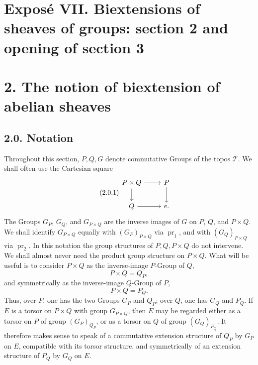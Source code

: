 \documentclass[11pt]{article}
\providecommand{\pr}{\operatorname{pr}}
\providecommand{\id}{\operatorname{id}}
\begin{document}
\providecommand{\BIEXT}{\operatorname{BIEXT}}
\providecommand{\Biext}{\operatorname{Biext}}
\providecommand{\GRAB}{\operatorname{GRAB}}
\providecommand{\TORSBIRIG}{\operatorname{TORSBIRIG}}
\providecommand{\Corr}{\operatorname{Corr}}
\providecommand{\sym}{\mathrm{sym}}
\providecommand{\id}{\mathrm{id}}
\providecommand{\cY}{\mathcal Y}
\providecommand{\cC}{\mathcal C}
\providecommand{\e}{\mathrm e}

\section*{Exposé VII. Biextensions of sheaves of groups: section 2 and opening of section 3}

\section*{2. The notion of biextension of abelian sheaves}

\subsection*{2.0. Notation}
Throughout this section, \(P,Q,G\) denote commutative Groups of the topos \(\mathcal T\).  We shall often use the Cartesian square
\begin{equation}\tag{2.0.1}
\begin{tikzcd}
P\times Q \arrow[r] \arrow[d] & P\arrow[d]\\
Q\arrow[r] & e .
\end{tikzcd}
\end{equation}
The Groups \(G_P\), \(G_Q\), and \(G_{P\times Q}\) are the inverse images of \(G\) on \(P\), \(Q\), and \(P\times Q\).  We shall identify \(G_{P\times Q}\) equally with \((G_P)_{P\times Q}\) via \(\pr_1\), and with \((G_Q)_{P\times Q}\) via \(\pr_2\).  In this notation the group structures of \(P,Q,P\times Q\) do not intervene.  We shall almost never need the product group structure on \(P\times Q\).  What will be useful is to consider \(P\times Q\) as the inverse-image \(P\)-Group of \(Q\),
\begin{equation}\tag{2.0.2}
  P\times Q=Q_P,
\end{equation}
and symmetrically as the inverse-image \(Q\)-Group of \(P\),
\begin{equation}\tag{2.0.3}
  P\times Q=P_Q.
\end{equation}
Thus, over \(P\), one has the two Groups \(G_P\) and \(Q_P\); over \(Q\), one has \(G_Q\) and \(P_Q\).  If \(E\) is a torsor on \(P\times Q\) with group \(G_{P\times Q}\), then \(E\) may be regarded either as a torsor on \(P\) of group \((G_P)_{Q_P}\), or as a torsor on \(Q\) of group \((G_Q)_{P_Q}\).  It therefore makes sense to speak of a commutative extension structure of \(Q_P\) by \(G_P\) on \(E\), compatible with its torsor structure, and symmetrically of an extension structure of \(P_Q\) by \(G_Q\) on \(E\).
\end{document}
